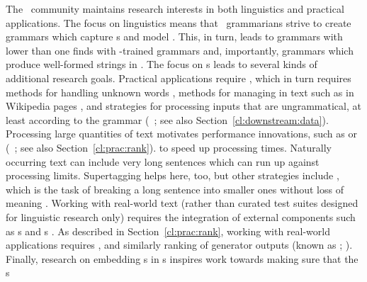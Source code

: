 \documentclass[output=paper
                ,modfonts
                ,nonflat
	        ,collection
	        ,collectionchapter
	        ,collectiontoclongg
 	        ,biblatex
                ,babelshorthands
                ,newtxmath
                ,draftmode
                ,colorlinks, citecolor=brown
]{./langsci/langscibook}
\begin{document}
The \delphin\ community maintains research interests in both
linguistics and practical applications. The focus on linguistics means
that \delphin\ grammarians strive to create grammars which capture
s and model . This, in turn,
leads to grammars with lower  than one finds with
-trained grammars and, importantly, grammars which produce
well-formed strings in . The focus on s
leads to several kinds of additional research goals. Practical applications
require , which in turn requires methods for handling 
unknown words
\citep[e.g.,][]{chartmapping}, methods for managing  in
text such as in Wikipedia pages \citep[e.g.,][]{FOY2010a-u}, and strategies
for processing inputs that are ungrammatical, at least according to
the grammar (\eg\ \citealp{W11-2923}; see also Section~\ref{cl:downstream:data}).
Processing large quantities of text motivates performance innovations, such as  or  (\eg\ \citealp{matsuzaki2007supertag,dridan2013ubertag}; see also Section~\ref{cl:prac:rank}). to speed
up processing times. Naturally occurring text can include very long 
sentences which can run up against processing limits. Supertagging helps here, too, but other strategies include \textit{}, which is the task of breaking a long sentence into smaller ones without loss of meaning \citep{muszynska:2016:ACL-SRW}.
Working with real-world text (rather than curated test suites designed
for linguistic research only) requires 
the integration of external components such as s 
\citep[e.g.,][]{Marimon2013a-u} and s \citep[e.g.,][]{L06-1115,Sch:Usz:Fed:08}. As described in Section~\ref{cl:prac:rank}, working with real-world applications requires  \citep[e.g.,][]{Tou:Man:Fli:Oep:05}, and similarly ranking of generator outputs (known as \textit{}; \citealt[e.g.,][]{Velldal:09}). Finally, research on embedding s in s inspires work  towards making sure that the s
\end{document}
